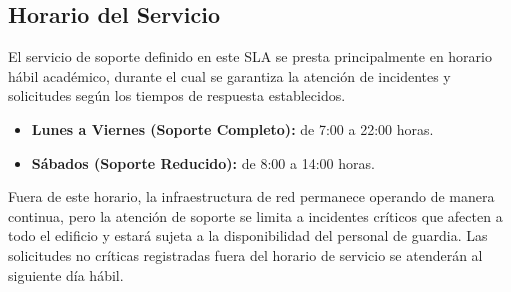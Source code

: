\subsection{Horario del Servicio}

El servicio de soporte definido en este SLA se presta principalmente en horario hábil académico, durante el cual se garantiza la atención de incidentes y solicitudes según los tiempos de respuesta establecidos.

\begin{itemize}
    \item \textbf{Lunes a Viernes (Soporte Completo):} de 7:00 a 22:00 horas.
    \item \textbf{Sábados (Soporte Reducido):} de 8:00 a 14:00 horas.
\end{itemize}

Fuera de este horario, la infraestructura de red permanece operando de manera continua, pero la atención de soporte se limita a incidentes críticos que afecten a todo el edificio y estará sujeta a la disponibilidad del personal de guardia. Las solicitudes no críticas registradas fuera del horario de servicio se atenderán al siguiente día hábil.
